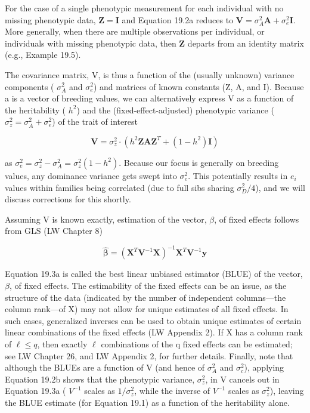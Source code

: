 \documentclass{article}
\begin{document}
For the case of a single phenotypic measurement for each individual with no missing phenotypic data,  $ \mathbf{Z} = \mathbf{I} $ and Equation 19.2a reduces to  $ \mathbf{V} = \sigma_A^2 \mathbf{A} + \sigma_e^2 \mathbf{I} $. More generally, when there are multiple observations per individual, or individuals with missing phenotypic data, then  $ \mathbf{Z} $ departs from an identity matrix (e.g., Example 19.5).

The covariance matrix, V, is thus a function of the (usually unknown) variance components ( $ \sigma_A^2 $ and  $ \sigma_e^2 $) and matrices of known constants (Z, A, and I). Because a is a vector of breeding values, we can alternatively express V as a function of the heritability ( $ h^2 $) and the (fixed-effect-adjusted) phenotypic variance ( $ \sigma_z^2 = \sigma_A^2 + \sigma_e^2 $) of the trait of interest

\begin{equation}
\mathbf{V}=\sigma_{z}^{2}\cdot\left(h^{2}\mathbf{Z}\mathbf{A}\mathbf{Z}^{T}+(1-h^{2})\mathbf{I}\right)
\tag{19.2b}
\label{eq:19_2b}
\end{equation}

as  $ \sigma_e^2 = \sigma_z^2 - \sigma_A^2 = \sigma_z^2(1 - h^2) $. Because our focus is generally on breeding values, any dominance variance gets swept into  $ \sigma_e^2 $. This potentially results in  $ e_i $ values within families being correlated (due to full sibs sharing  $ \sigma_D^2/4 $), and we will discuss corrections for this shortly.

Assuming V is known exactly, estimation of the vector,  $ \beta $, of fixed effects follows from GLS (LW Chapter 8)

\begin{equation}
\hat{\boldsymbol{\beta}}=\left(\mathbf{X}^{T}\mathbf{V}^{-1}\mathbf{X}\right)^{-1}\mathbf{X}^{T}\mathbf{V}^{-1}\mathbf{y}
\tag{19.3a}
\label{eq:19_3a}
\end{equation}

Equation 19.3a is called the best linear unbiased estimator (BLUE) of the vector,  $ \beta $, of fixed effects. The estimability of the fixed effects can be an issue, as the structure of the data (indicated by the number of independent columns—the column rank—of X) may not allow for unique estimates of all fixed effects. In such cases, generalized inverses can be used to obtain unique estimates of certain linear combinations of the fixed effects (LW Appendix 2). If X has a column rank of  $ \ell \leq q $, then exactly  $ \ell $ combinations of the q fixed effects can be estimated; see LW Chapter 26, and LW Appendix 2, for further details. Finally, note that although the BLUEs are a function of V (and hence of  $ \sigma_A^2 $ and  $ \sigma_c^2 $), applying Equation 19.2b shows that the phenotypic variance,  $ \sigma_z^2 $, in V cancels out in Equation 19.3a ( $ V^{-1} $ scales as  $ 1/\sigma_z^2 $, while the inverse of  $ V^{-1} $ scales as  $ \sigma_z^2 $), leaving the BLUE estimate (for Equation 19.1) as a function of the heritability alone.
\end{document}
